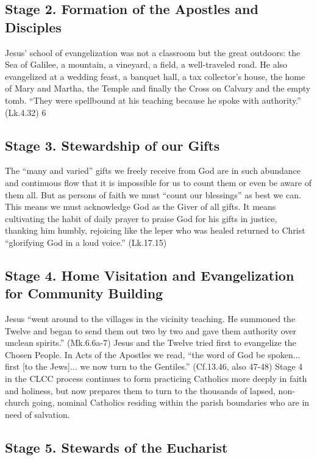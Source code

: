 \documentclass{article}        %
\begin{document}
\subsection{Stage 2. Formation of the Apostles and Disciples}

Jesus' school of evangelization was not a classroom but the great outdoors: the
Sea of Galilee, a mountain, a vineyard, a field, a well-traveled road. He also
evangelized at a wedding feast, a banquet hall, a tax collector's house, the
home of Mary and Martha, the Temple and finally the Cross on Calvary and the
empty tomb. ``They were spellbound at his teaching because he spoke with
authority.'' (Lk.4.32)
6

\subsection{Stage 3. Stewardship of our Gifts}

The ``many and varied'' gifts we freely receive from God are in such abundance
and continuous flow that it is impossible for us to count them or even be aware
of them all. But as persons of faith we must ``count our blessings'' as best we
can. This means we must acknowledge God as the Giver of all gifts. It means
cultivating the habit of daily prayer to praise God for his gifts in justice,
thanking him humbly, rejoicing like the leper who was healed returned to Christ
``glorifying God in a loud voice.'' (Lk.17.15)

\subsection{Stage 4. Home Visitation and Evangelization for Community Building}

Jesus ``went around to the villages in the vicinity teaching. He summoned the
Twelve and began to send them out two by two and gave them authority over
unclean spirits.'' (Mk.6.6a-7) Jesus and the Twelve tried first to evangelize
the Chosen People. In Acts of the Apostles we read, ``the word of God be
spoken... first [to the Jews]... we now turn to the Gentiles.'' (Cf.13.46, also
47-48) Stage 4 in the CLCC process continues to form practicing Catholics more
deeply in faith and holiness, but now prepares them to turn to the thousands of
lapsed, non-church going, nominal Catholics residing within the parish
boundaries who are in need of salvation.

\subsection{Stage 5. Stewards of the Eucharist}
\end{document}
